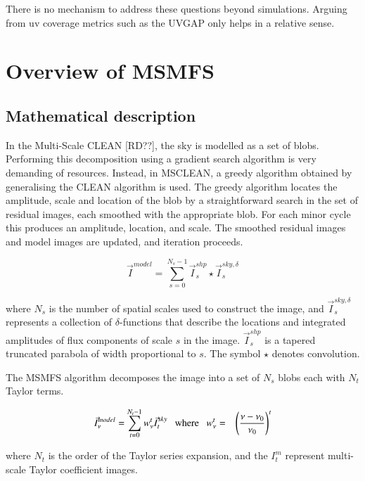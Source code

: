 \documentclass[11pt,a4paper,variablewidth]{article}
\begin{document}
There is no mechanism to address these questions beyond simulations. Arguing from uv coverage metrics such as the UVGAP only helps in a relative sense.

\clearpage


\section{Overview of MSMFS}
\label{sec:overview}

\subsection{Mathematical description}

In the Multi-Scale CLEAN [RD??], the sky is modelled as a set of blobs. Performing this decomposition using a gradient search algorithm is very demanding of resources. Instead, in MSCLEAN, a greedy algorithm obtained by generalising the CLEAN algorithm is used. The greedy algorithm locates the amplitude, scale and location of the blob by a straightforward search in the set of residual images, each smoothed with the appropriate blob. For each minor cycle this produces an amplitude, location, and scale. The smoothed residual images and model images are updated, and iteration proceeds.

\begin{equation}
\vec{I}^{model} = \sum_{s=0}^{N_s-1}  \vec{I}^{shp}_{s} \star \vec{I}^{sky,\delta}_s
\label{Eq:ms_model}
\end{equation}

where $N_s$ is the number of spatial scales used to construct the image, and
$\vec{I}^{sky,\delta}_{s}$ represents a collection of $\delta$-functions that describe the locations
and integrated amplitudes of flux components of scale $s$ in the image. $\vec{I}^{shp}_s$ is a tapered truncated parabola of width proportional to $s$.
The symbol $\star$ denotes convolution. 

The MSMFS algorithm decomposes the image into a set of $N_s$ blobs each with $N_t$ Taylor terms. 

\begin{eqnarray}
\label{eqn:mf_model}
\vec{I}^{model}_{\nu} = \sum_{t=0}^{N_t-1} {w_{\nu}^t} \vec{I}^{sky}_{t} ~~~\mathrm{where}~~~ {w_{\nu}^t}&=&{\left(\frac{\nu-\nu_0}{\nu_0}\right)}^t 
\end{eqnarray}

where $N_t$ is the order of the Taylor series expansion, and 
the $I^m_t$ represent multi-scale Taylor coefficient images.
\end{document}
